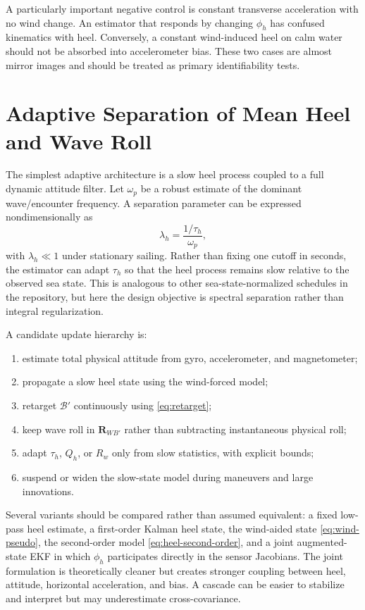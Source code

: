 \documentclass[conference]{IEEEtran}
\DeclareRobustCommand{\mat}[1]{\bm{#1}}
\begin{document}
A particularly important negative control is constant transverse acceleration with no
wind change. An estimator that responds by changing $\phi_h$ has confused kinematics
with heel. Conversely, a constant wind-induced heel on calm water should not be absorbed
into accelerometer bias. These two cases are almost mirror images and should be treated as
primary identifiability tests.

\section{Adaptive Separation of Mean Heel and Wave Roll}
\label{sec:adaptive-separation}

The simplest adaptive architecture is a slow heel process coupled to a full dynamic
attitude filter. Let $\omega_p$ be a robust estimate of the dominant wave/encounter
frequency. A separation parameter can be expressed nondimensionally as
\begin{equation}
 \lambda_h=\frac{1/\tau_h}{\omega_p},
 \label{eq:lambda-h}
\end{equation}
with $\lambda_h\ll1$ under stationary sailing. Rather than fixing one cutoff in seconds,
the estimator can adapt $\tau_h$ so that the heel process remains slow relative to the
observed sea state. This is analogous to other sea-state-normalized schedules in the
repository, but here the design objective is spectral separation rather than integral
regularization.

A candidate update hierarchy is:
\begin{enumerate}
 \item estimate total physical attitude from gyro, accelerometer, and magnetometer;
 \item propagate a slow heel state using the wind-forced model;
 \item retarget $\mathcal B'$ continuously using \eqref{eq:retarget};
 \item keep wave roll in $\mat R_{WB'}$ rather than subtracting instantaneous physical roll;
 \item adapt $\tau_h$, $Q_h$, or $R_w$ only from slow statistics, with explicit bounds;
 \item suspend or widen the slow-state model during maneuvers and large innovations.
\end{enumerate}

Several variants should be compared rather than assumed equivalent: a fixed low-pass
heel estimate, a first-order Kalman heel state, the wind-aided state
\eqref{eq:wind-pseudo}, the second-order model \eqref{eq:heel-second-order}, and a joint
augmented-state EKF in which $\phi_h$ participates directly in the sensor Jacobians. The
joint formulation is theoretically cleaner but creates stronger coupling between heel,
attitude, horizontal acceleration, and bias. A cascade can be easier to stabilize and
interpret but may underestimate cross-covariance.
\end{document}
